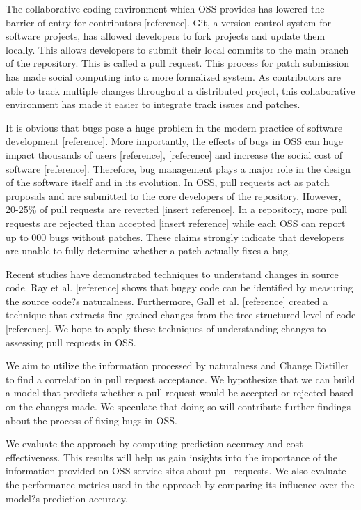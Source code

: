 \documentclass[10pt, conference]{IEEEtran}
\begin{document}
The collaborative coding environment which OSS provides has lowered the barrier of entry for contributors [reference]. Git, a version control system for software projects, has allowed developers to fork projects and update them locally. This allows developers to submit their local commits to the main branch of the repository. This is called a pull request. This process for patch submission has made social computing into a more formalized system. As contributors are able to track multiple changes throughout a distributed project, this collaborative environment has made it easier to integrate track issues and patches.

It is obvious that bugs pose a huge problem in the modern practice of software development  [reference]. More importantly, the effects of bugs in OSS can huge impact thousands of users [reference], [reference] and increase the social cost of software [reference]. Therefore, bug management plays a major role in the design of the software itself and in its evolution. In OSS, pull requests act as patch proposals and are submitted to the core developers of the repository. However, 20-25\% of pull requests are reverted [insert reference]. In a repository, more pull requests are rejected than accepted [insert reference] while each OSS can report up to 000 bugs without patches. These claims strongly indicate that developers are unable to fully determine whether a patch actually fixes a bug.

Recent studies have demonstrated techniques to understand changes in source code. Ray et al. [reference] shows that buggy code can be identified by measuring the source code?s naturalness. Furthermore, Gall et al. [reference] created a technique that extracts fine-grained changes from the tree-structured level of code [reference]. We hope to apply these techniques of understanding changes to assessing pull requests in OSS.

We aim to utilize the information processed by naturalness and Change Distiller to find a correlation in pull request acceptance. We hypothesize that we can build a model that predicts whether a pull request would be accepted or rejected based on the changes made. We speculate that doing so will contribute further findings about the process of fixing bugs in OSS.

We evaluate the approach by computing prediction accuracy and cost effectiveness. This results will help us gain insights into the importance of the information provided on OSS service sites about pull requests. We also evaluate the performance metrics used in the approach by comparing its influence over the model?s prediction accuracy. 
\end{document}

